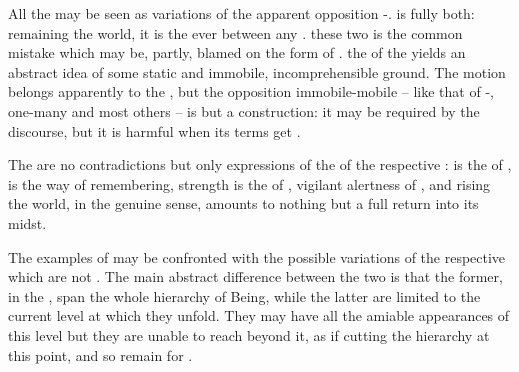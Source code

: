  All the  may be seen as
variations of the apparent opposition -.
 is fully both: remaining   the world, it is
the  ever  between any . 
these two  is the common mistake which may be, partly, blamed on the
 form of .   the
 of the  yields an abstract idea of some static
and immobile, incomprehensible ground.   The 
motion belongs apparently to the , but the opposition
immobile-mobile -- like that of -, one-many and
most others -- is but a construction: it may be required by the 
discourse, but it is harmful when its terms get .

The  are no contradictions but only  expressions
of the  of the respective :  is the 
of ,  is the way of remembering, strength is the
 of , vigilant alertness of , and rising
 the world, in the genuine sense, amounts to nothing but a full return
into its midst. 



\label{sub:examples}
The examples of  may be confronted with the possible
variations of the respective  which are not . The main abstract difference between the two is that the former,
 in the , span the whole hierarchy of Being,
while the latter are limited to the current level at which they unfold. They may
have all the amiable appearances of this level but they are unable to reach
beyond it, as if cutting the hierarchy at this point, and so remain 
for .


